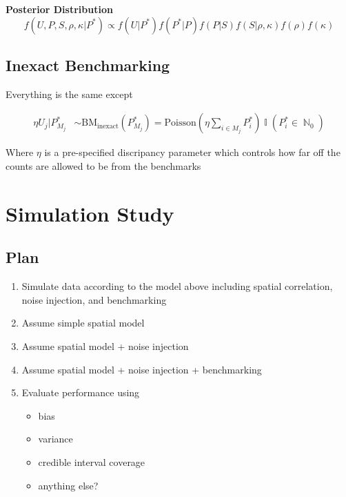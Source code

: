 \documentclass[12pt]{article}
\DeclareMathOperator{\N}{\mathbb{N}}
\DeclareMathOperator{\I}{\mathbb{I}}
\begin{document}
\textbf{Posterior Distribution}
\[ f(U, P, S, \rho, \kappa |P^*) \propto f(U|P^*) f(P^*|P) f(P|S) f(S|\rho, \kappa) f(\rho) f(\kappa) \]

\newpage

\subsection{Inexact Benchmarking}

Everything is the same except 

\begin{align}
    \eta U_j |P_{M_j}^* &\sim \text{BM}_{\text{inexact}}(P_{M_j}^*) = \text{Poisson}(\eta \sum_{i \in M_j} P_i^*) \I(P_i^* \in \N_0)
\end{align} 

Where $\eta$ is a pre-specified discripancy parameter which controls how far off the counts are allowed to be from the benchmarks 

\section{Simulation Study}

\subsection{Plan}

\begin{enumerate}
    \item Simulate data according to the model above including spatial correlation, noise injection, and benchmarking

    \item Assume simple spatial model

    \item Assume spatial model + noise injection 

    \item Assume spatial model + noise injection + benchmarking

    \item Evaluate performance using 
    \begin{itemize}
        \item bias
        \item variance
        \item credible interval coverage
        \item anything else? 
    \end{itemize}
\end{enumerate}
\end{document}
